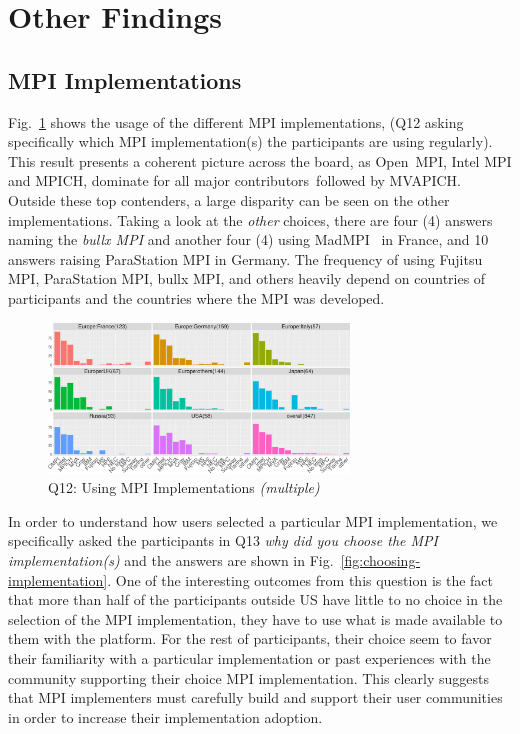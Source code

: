 \documentclass[preprint,5p,times]{elsarticle}
\def\myquote#1{{\it #1}}
\newcommand{\revision}[2]{{\color{blue}#2}}
\def\mcountries{major contributors\xspace{}}%
\begin{document}
\section{Other Findings}

\subsection{MPI Implementations}

 Fig.~\ref{fig:using-implementations} shows the usage of the different MPI
 implementations, (Q12 asking specifically which MPI implementation(s) the
 participants are using regularly). This result presents a coherent picture
 across the board, as Open~MPI, Intel MPI and MPICH, dominate \revision{in}{for} all
 \mcountries\ followed by MVAPICH. Outside these top contenders, a large
 disparity can be seen on the other implementations. Taking a look at the
 \myquote{other} choices, there are four (4) answers naming the \myquote{bullx
 MPI} and another four (4) using MadMPI~\cite{madmpi} in France, and 10 answers
 raising ParaStation MPI in Germany. The frequency of using Fujitsu MPI,
 ParaStation MPI, bullx MPI, and others heavily depend on countries of
 participants and the countries where the MPI was developed.

  \begin{figure}[tb]
    \begin{center}
      \includegraphics[width=8.0cm]{R-scripts/Q12.pdf}
      \vspace{-1.5mm}
      \caption{Q12: Using MPI Implementations {\it(multiple)}}
      \label{fig:using-implementations}
\vspace{-3mm}%
    \end{center}
  \end{figure}

In order to understand how users selected a particular MPI implementation, we specifically asked the participants in Q13 \myquote{why did you
choose the MPI implementation(s)} and the answers are shown in
Fig.~\ref{fig:choosing-implementation}.
%
One of the interesting outcomes from this question is the fact that more than
half of the participants outside US have little to no choice in the selection of
the MPI implementation, they have to use what is made available to them with the
platform. For the rest of participants, their choice seem to favor their
familiarity with a particular implementation or past experiences with the
community supporting their choice MPI implementation.
%
This clearly suggests that MPI implementers must carefully build and support
their user communities in order to increase their implementation adoption.
\end{document}
